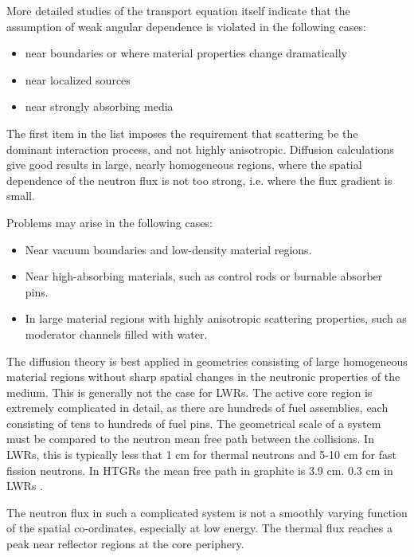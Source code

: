 \documentclass[11pt,letterpaper]{article}
\begin{document}
More detailed studies of the transport equation itself indicate that the assumption of weak angular dependence is violated in the following cases:
\begin{itemize}
    \item near boundaries or where material properties change dramatically
    \item near localized sources
    \item near strongly absorbing media
\end{itemize}

The first item in the list imposes the requirement that scattering be the dominant interaction process, and not highly anisotropic.
Diffusion calculations give good results in large, nearly homogeneous regions, where the spatial dependence
of the neutron flux is not too strong, i.e. where the flux gradient is small.

Problems may arise in the following cases:
\begin{itemize}
	\item Near vacuum boundaries and low-density material regions.
	\item Near high-absorbing materials, such as control rods or burnable absorber pins.
	\item In large material regions with highly anisotropic scattering properties, such as moderator channels filled with water.
\end{itemize}

The diffusion theory is best applied in geometries consisting of large homogeneous material regions without sharp spatial changes in the neutronic properties of the medium.
This is generally not the case for \glspl{LWR}.
The active core region is extremely complicated in detail, as there are hundreds of fuel assemblies, each consisting of tens to hundreds of fuel pins.
The geometrical scale of a system must be compared to the neutron mean free path between the
collisions.
In \glspl{LWR}, this is typically less that 1 cm for thermal neutrons and 5-10 cm for fast fission neutrons.
In \glspl{HTGR} the mean free path in graphite is 3.9 cm. 0.3 cm in \glspl{LWR} \cite{gougar_high_2019}.

The neutron flux in such a complicated system is not a smoothly varying function of the spatial co-ordinates, especially at low energy.
The thermal flux reaches a peak near reflector regions at the core periphery.
\end{document}
